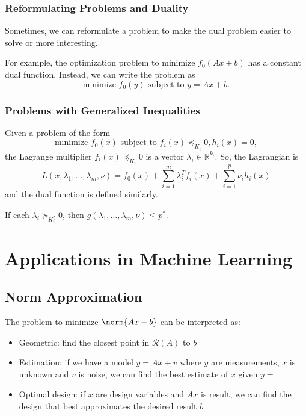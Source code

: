 \documentclass[11pt]{article}
\begin{document}
\subsubsection*{Reformulating Problems and Duality} 
Sometimes, we can reformulate a problem to make the dual problem easier to solve or more interesting. \par 

For example, the optimization problem to minimize $f_0(Ax + b)$ has a constant dual function. Instead, we can write the problem as 
\[ \text{minimize } f_0(y) \text{ subject to } y = Ax + b. \] 
 
\subsubsection*{Problems with Generalized Inequalities} 
Given a problem of the form 
\[ \text{minimize } f_0(x) \text{ subject to } f_i(x) \preceq_{K_i} 0, h_i(x) = 0, \]
the Lagrange multiplier $f_i(x) \preceq_{K_i} 0$ is a vector $\lambda_i \in \mathbb{R}^{k_i}$. So, the Lagrangian is 
\[ L(x, \lambda_1, \ldots, \lambda_m, \nu) = f_0(x) + \sum_{i=1}^m \lambda_i^T f_i(x) + \sum_{i=1}^p \nu_ih_i(x) \] 
and the dual function is defined similarly. \par 
If each $\lambda_i \succeq_{K_i^*} 0$, then $g(\lambda_1, \ldots, \lambda_m, \nu) \leq p^*$. 

\newpage 
\section{Applications in Machine Learning} 
\subsection{Norm Approximation} 
The problem to minimize $\norm{Ax - b}$ can be interpreted as: 
\begin{itemize}
    \item Geometric: find the closest point in $\mathcal{R}(A)$ to $b$
    \item Estimation: if we have a model $y = Ax + v$ where $y$ are measurements, $x$ is unknown and $v$ is noise, we can find the best estimate of $x$ given $y = $
    \item Optimal design: if $x$ are design variables and $Ax$ is result, we can find the design that best approximates the desired result $b$
\end{itemize}
\end{document}
